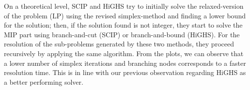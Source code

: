 On a theoretical level, SCIP and HiGHS try to initially solve the relaxed-version of the problem (LP) using the revised simplex-method and finding a lower bound for the solution; then, if the solution found is not integer, they start to solve the MIP part using branch-and-cut (SCIP) or branch-and-bound (HiGHS). For the resolution of the sub-problems generated by these two methods, they proceed recursively by applying the same algorithm.
From the plots, we can observe that a lower number of simplex iterations and branching nodes corresponds to a faster resolution time. This is in line with our previous observation regarding HiGHS as a better performing solver.
